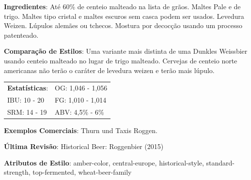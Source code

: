 \textbf{Ingredientes}: Até 60\% de centeio malteado na lista de grãos. Maltes Pale e de trigo. Maltes tipo cristal e maltes escuros sem casca podem ser usados. Levedura Weizen. Lúpulos alemães ou tchecos. Mostura por decocção usando um processo patenteado.

\textbf{Comparação de Estilos}: Uma variante mais distinta de uma Dunkles Weissbier usando centeio malteado no lugar de trigo malteado. Cervejas de centeio norte americanas não terão o caráter de levedura weizen e terão mais lúpulo.

\begin{tabular}{@{}p{35mm}p{35mm}@{}}
  \textbf{Estatísticas}: & OG: 1,046 - 1,056  \\
  IBU: 10 - 20  & FG: 1,010 - 1,014  \\
  SRM: 14 - 19 & ABV: 4,5\% - 6\%
\end{tabular}

\textbf{Exemplos Comerciais}: Thurn und Taxis Roggen.

\textbf{Última Revisão}: Historical Beer: Roggenbier (2015)

\textbf{Atributos de Estilo}: amber-color, central-europe, historical-style, standard-strength, top-fermented, wheat-beer-family
